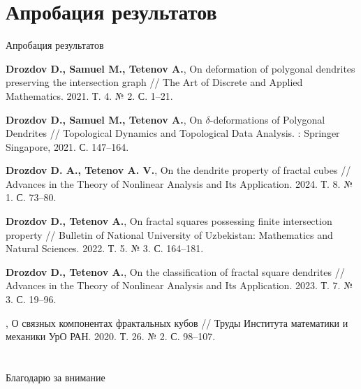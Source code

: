 \documentclass[aspectratio=1610, 10pt, notheorems]{beamer}
\begin{document}
\section{Апробация результатов}
\begin{frame}{Апробация результатов}

{\normalsize
\begin{thebibliography}{9}
{\small
{}
{\bf Drozdov D., Samuel M., Tetenov A.},
On deformation of polygonal dendrites preserving the intersection graph //
The Art of Discrete and Applied Mathematics. 2021. Т. 4. № 2. С. 1--21.

{\bf Drozdov D., Samuel M., Tetenov A.}, 
On $\delta$-deformations of Polygonal Dendrites // 
Topological Dynamics and Topological Data Analysis. : Springer Singapore, 2021. С. 147--164.

{\bf Drozdov D. A., Tetenov A. V.}, On the dendrite property of fractal cubes // Advances in the Theory of Nonlinear Analysis and Its Application. 2024. Т. 8. № 1. С. 73--80.

{\bf Drozdov D., Tetenov A.}, 
On fractal squares possessing finite intersection property // 
Bulletin of National University of Uzbekistan: Mathematics and Natural Sciences. 2022. Т. 5. № 3. С. 164--181.

{\bf Drozdov D., Tetenov A.}, 
On the classification of fractal square dendrites // 
Advances in the Theory of Nonlinear Analysis and Its Application. 2023. Т. 7. № 3. С. 19--96.

,
О связных компонентах фрактальных кубов // 
Труды Института математики и механики УрО РАН. 2020. Т. 26. № 2. С. 98--107.}
\end{thebibliography}}
\end{frame}

\section{}
\begin{frame}{}
\begin{center}
\Huge Благодарю за внимание
\end{center}
\end{frame}
\end{document}
